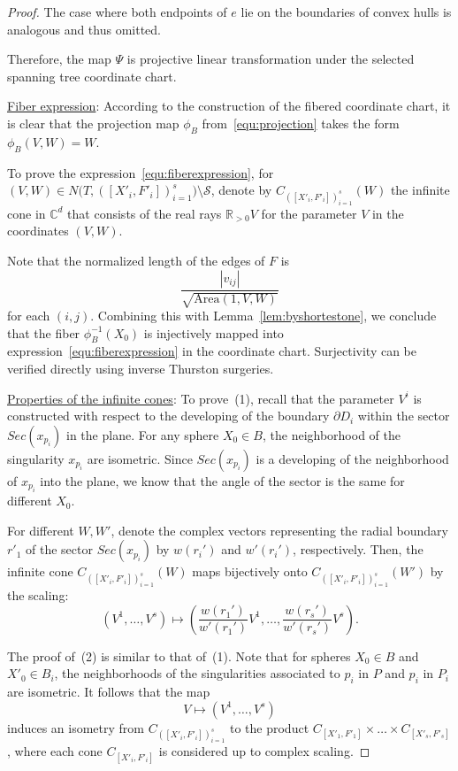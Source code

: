 \documentclass{compositio}
\numberwithin{equation}{section}
\numberwithin{figure}{section}
\theoremstyle{definition}
\theoremstyle{plain}
\begin{document}
{\begin{proof}
The case where both endpoints of $e$ lie on the boundaries of convex hulls is analogous and thus omitted.

Therefore, the map $\Psi$ is projective linear transformation under the selected spanning tree coordinate chart.\newline

\noindent\underline{Fiber expression}:
According to the construction of the fibered coordinate chart, it is clear that the projection map $\phi_B$ from~\eqref{equ:projection} takes the form $\phi_B(V,W) = W$.

To prove the expression~\eqref{equ:fiberexpression}, for $(V,W)\in N\big(T, ([X'_i, F'_i])_{i=1}^s\big)\setminus\mathcal{S}$, denote by $C_{([X'_i, F'_i])_{i=1}^s}(W)$ the infinite cone in $\mathbb{C}^d$ that consists of the real rays $\mathbb{R}_{>0}V$ for the parameter $V$ in the coordinates $(V,W)$.

Note that the normalized length of the edges of $F$ is 
$$
\frac{|v_{ij}|}{\sqrt{\mathrm{Area}(1,V,W)}}
$$
for each $(i,j)$. Combining this with Lemma~\ref{lem:byshortestone}, we conclude that the fiber $\phi_B^{-1}(X_0)$ is injectively mapped into expression~\eqref{equ:fiberexpression} in the coordinate chart.  Surjectivity can be verified directly using inverse Thurston surgeries.\newline

\noindent\underline{Properties of the infinite cones}:
To prove~(1), recall that the parameter $V^i$ is constructed with respect to the developing of the boundary $\partial D_i$ within the sector $Sec(x_{p_i})$ in the plane. For any sphere $X_0\in B$, the neighborhood of the singularity $x_{p_i}$ are isometric. Since $Sec(x_{p_i})$ is a developing of the neighborhood of $x_{p_i}$ into the plane, we know that the angle of the sector is the same for different $X_0$.

For different $W, W'$, denote the complex vectors representing the radial boundary $r'_1$ of the sector $Sec(x_{p_i})$ by $w(r_i')$ and $w'(r_i')$, respectively.
Then, the infinite cone $C_{([X'_i, F'_i])_{i=1}^s}(W)$ maps bijectively onto $C_{([X'_i, F'_i])_{i=1}^s}(W')$ by the scaling:
$$
(V^1,\ldots,V^s)\mapsto \left(\frac{w(r_1')}{w'(r_1')}V^1,\ldots,\frac{w(r_s')}{w'(r_s')}V^s\right).
$$

The proof of~(2) is similar to that of~(1). Note that for spheres $X_0\in B$ and $X'_0\in B_i$, the neighborhoods of the singularities associated to $p_i$ in $P$ and $p_i$ in $P_i$ are isometric. It follows that the map
$$
V\mapsto (V^1,\ldots, V^s)
$$
induces an isometry from $C_{([X'_i, F'_i])_{i=1}^s}$ to the product $C_{[X'_1, F'_1]} \times \ldots \times C_{[X'_s, F'_s]}$, where each cone $C_{[X'_i, F'_i]}$ is considered up to complex scaling.
\end{proof}

}
\end{document}
